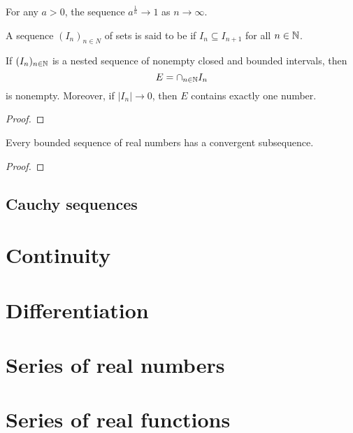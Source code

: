 \begin{example}
  For any \(a > 0\), the sequence \(a^{\frac 1 n} \to 1\) as \(n \to \infty\).
\end{example}

\begin{definition}
  A sequence \((I_{n})_{n \in N}\) of sets is said to be  if \(I_{n} \subseteq I_{n+1}\) for all \(n \in \mathbb{N}\).
\end{definition}

\begin{theorem}\label{thm:real-analysis:nested-interval-property}
  If \((I_{n})_{n \in \mathbb{N}}\) is a nested sequence of nonempty closed and bounded intervals, then
  \[E = \cap_{n \in \mathbb{N}} I_{n}\]
  is nonempty. Moreover, if \(|I_{n}| \to 0\), then \(E\) contains exactly one number.
\end{theorem}

\begin{proof}
\end{proof}

\begin{theorem}\label{thm:real-analysis:bolzano-weierstrass}
  Every bounded sequence of real numbers has a convergent subsequence.
\end{theorem}

\begin{proof}
\end{proof}

\subsection{Cauchy sequences}

\section{Continuity}

\section{Differentiation}

\section{Series of real numbers}

\section{Series of real functions}

